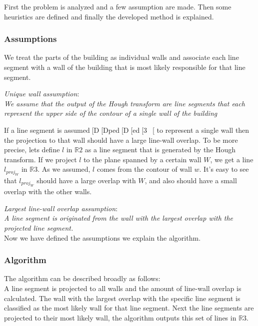 \documentclass[10pt]{article}
\begin{document}
	First the problem is analyzed and a few assumption are made.  Then some
	heuristics are defined and finally the developed method is explained.

	\subsubsection{Assumptions}
	We treat the parts of the building as individual walls and associate each
	line segment with a wall of the building that is most likely responsible for
	that line segment. 

	\emph{Unique wall assumption}:\\
	\emph{We assume that the output of the Hough transform are line segments that
	each represent the upper side of the contour of a single wall of the building}



	If a line segment is assumed[D[Dped[D[ed[3~[ to represent a single wall then the
	projection to that wall should have a large line-wall overlap. To be more
	precise, lets define $l$ in $\mathbb{R}2$ as a line segment that is generated by the Hough
	transform.  If we project $l$ to the plane spanned by a certain wall $W$, we
	get a line $l_{proj_W}$ in $\mathbb{R}3$.  As we assumed, $l$ comes from the 
	contour of wall $w$. It's easy to see that $l_{proj_W}$
	should have a large overlap with $W$, and also should have a small overlap with
	the other walls.
	
	\emph{Largest line-wall overlap assumption}:\\
	\emph{A line segment is originated from the wall with the largest overlap
	with the projected line segment.}\\

	Now we have defined the assumptions we explain the algorithm.

	\subsubsection{Algorithm}
	The algorithm can be described broadly as follows:\\
	A line segment is projected to all walls and the amount of line-wall overlap is
	calculated. The wall with the largest overlap with the specific line
segment is classified as the most likely wall for that line segment.
	Next the line segments are projected to their most likely wall, the
	algorithm outputs this set of lines in $\mathbb{R}3$. 
	
\end{document}

